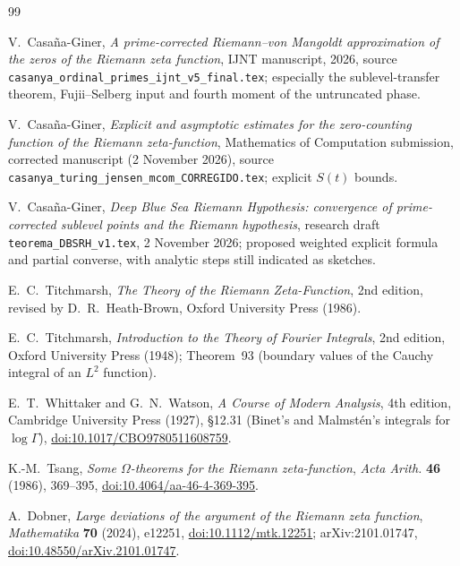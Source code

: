 \documentclass[11pt,a4paper]{article}
\numberwithin{equation}{section}
\theoremstyle{definition}
\theoremstyle{remark}
\begin{document}
\begin{thebibliography}{99}

V.~Casa\~na-Giner, \emph{A prime-corrected Riemann--von Mangoldt approximation of the zeros of the Riemann zeta function}, IJNT manuscript, 2026, source \texttt{casanya\_ordinal\_primes\_ijnt\_v5\_final.tex}; especially the sublevel-transfer theorem, Fujii--Selberg input and fourth moment of the untruncated phase.

V.~Casa\~na-Giner, \emph{Explicit and asymptotic estimates for the zero-counting function of the Riemann zeta-function}, Mathematics of Computation submission, corrected manuscript (2 November 2026), source \texttt{casanya\_turing\_jensen\_mcom\_CORREGIDO.tex}; explicit $S(t)$ bounds.

V.~Casa\~na-Giner, \emph{Deep Blue Sea Riemann Hypothesis: convergence of prime-corrected sublevel points and the Riemann hypothesis}, research draft \texttt{teorema\_DBSRH\_v1.tex}, 2 November 2026; proposed weighted explicit formula and partial converse, with analytic steps still indicated as sketches.

E.~C.~Titchmarsh, \emph{The Theory of the Riemann Zeta-Function}, 2nd edition, revised by D.~R.~Heath-Brown, Oxford University Press (1986).

E.~C.~Titchmarsh, \emph{Introduction to the Theory of Fourier Integrals}, 2nd edition, Oxford University Press (1948); Theorem~93 (boundary values of the Cauchy integral of an $L^2$ function).

E.~T.~Whittaker and G.~N.~Watson, \emph{A Course of Modern Analysis}, 4th edition, Cambridge University Press (1927), \S12.31 (Binet's and Malmst\'en's integrals for $\log\Gamma$), \href{https://doi.org/10.1017/CBO9780511608759}{doi:10.1017/CBO9780511608759}.

K.-M.~Tsang, \emph{Some $\Omega$-theorems for the Riemann zeta-function}, \emph{Acta Arith.} \textbf{46} (1986), 369--395, \href{https://doi.org/10.4064/aa-46-4-369-395}{doi:10.4064/aa-46-4-369-395}.

A.~Dobner, \emph{Large deviations of the argument of the Riemann zeta function}, \emph{Mathematika} \textbf{70} (2024), e12251, \href{https://doi.org/10.1112/mtk.12251}{doi:10.1112/mtk.12251}; arXiv:2101.01747, \href{https://doi.org/10.48550/arXiv.2101.01747}{doi:10.48550/arXiv.2101.01747}.


\end{thebibliography}
\end{document}
